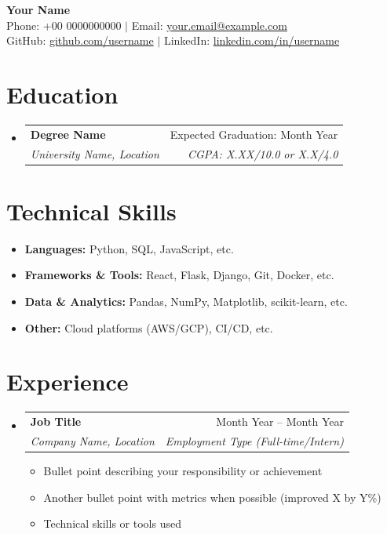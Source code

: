 \documentclass[11pt,a4paper]{article}
\makeatletter
\newcommand{\resumeSubheading}[4]{
  \item
    \begin{tabular*}{\textwidth}{l@{\extracolsep{\fill}}r}
      \textbf{#1} & #2 \\
      \textit{#3} & \textit{#4} \\
    \end{tabular*}
}
\makeatother
\begin{document}
\begin{center}
    \textbf{\LARGE Your Name} \\
    \vspace{5pt}
    Phone: +00 0000000000 $|$ 
    Email: \href{mailto:your.email@example.com}{your.email@example.com} \\
    GitHub: \href{https://github.com/username}{github.com/username} $|$ 
    LinkedIn: \href{https://linkedin.com/in/username}{linkedin.com/in/username}
\end{center}

\vspace{-10pt}

\section{Education}
\begin{itemize}[leftmargin=0in, label={}]
    \resumeSubheading
      {Degree Name}{Expected Graduation: Month Year}
      {University Name, Location}{CGPA: X.XX/10.0 or X.X/4.0}
\end{itemize}

\section{Technical Skills}
\begin{itemize}[leftmargin=0in, label={}]
    \item \textbf{Languages:} Python, SQL, JavaScript, etc.
    \item \textbf{Frameworks \& Tools:} React, Flask, Django, Git, Docker, etc.
    \item \textbf{Data \& Analytics:} Pandas, NumPy, Matplotlib, scikit-learn, etc.
    \item \textbf{Other:} Cloud platforms (AWS/GCP), CI/CD, etc.
\end{itemize}

\section{Experience}
\begin{itemize}[leftmargin=0in, label={}]
    \resumeSubheading
      {Job Title}{Month Year -- Month Year}
      {Company Name, Location}{Employment Type (Full-time/Intern)}
      \begin{itemize}[leftmargin=0.15in]
        \item Bullet point describing your responsibility or achievement
        \item Another bullet point with metrics when possible (improved X by Y\%)
        \item Technical skills or tools used
      \end{itemize}
      
\end{itemize}
\end{document}
